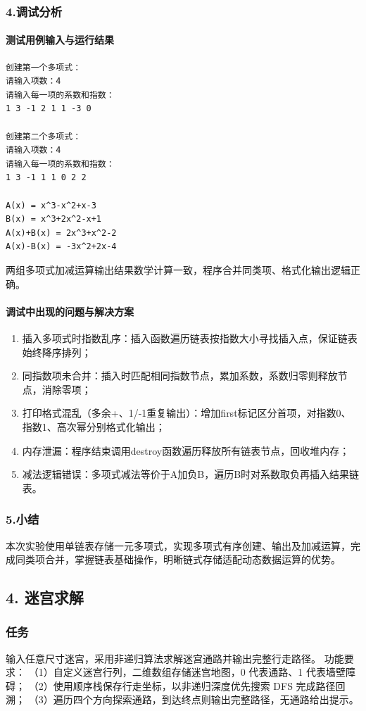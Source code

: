 \documentclass{ctexart}
\begin{document}
\subsubsection{4.调试分析}
\paragraph{测试用例输入与运行结果}
\begin{verbatim}
创建第一个多项式：
请输入项数：4
请输入每一项的系数和指数：
1 3 -1 2 1 1 -3 0

创建第二个多项式：
请输入项数：4 
请输入每一项的系数和指数：
1 3 -1 1 1 0 2 2

A(x) = x^3-x^2+x-3
B(x) = x^3+2x^2-x+1
A(x)+B(x) = 2x^3+x^2-2
A(x)-B(x) = -3x^2+2x-4
\end{verbatim}
两组多项式加减运算输出结果数学计算一致，程序合并同类项、格式化输出逻辑正确。

\paragraph{调试中出现的问题与解决方案}
\begin{enumerate}
    \item 插入多项式时指数乱序：插入函数遍历链表按指数大小寻找插入点，保证链表始终降序排列；
    \item 同指数项未合并：插入时匹配相同指数节点，累加系数，系数归零则释放节点，消除零项；
    \item 打印格式混乱（多余+、1/-1重复输出）：增加first标记区分首项，对指数0、指数1、高次幂分别格式化输出；
    \item 内存泄漏：程序结束调用destroy函数遍历释放所有链表节点，回收堆内存；
    \item 减法逻辑错误：多项式减法等价于A加负B，遍历B时对系数取负再插入结果链表。
\end{enumerate}

\subsubsection{5.小结}
本次实验使用单链表存储一元多项式，实现多项式有序创建、输出及加减运算，完成同类项合并，掌握链表基础操作，明晰链式存储适配动态数据运算的优势。

\subsection {4. 迷宫求解}
\subsubsection {任务}
输入任意尺寸迷宫，采用非递归算法求解迷宫通路并输出完整行走路径。
功能要求：
（1）自定义迷宫行列，二维数组存储迷宫地图，0 代表通路、1 代表墙壁障碍；
（2）使用顺序栈保存行走坐标，以非递归深度优先搜索 DFS 完成路径回溯；
（3）遍历四个方向探索通路，到达终点则输出完整路径，无通路给出提示。
\end{document}
